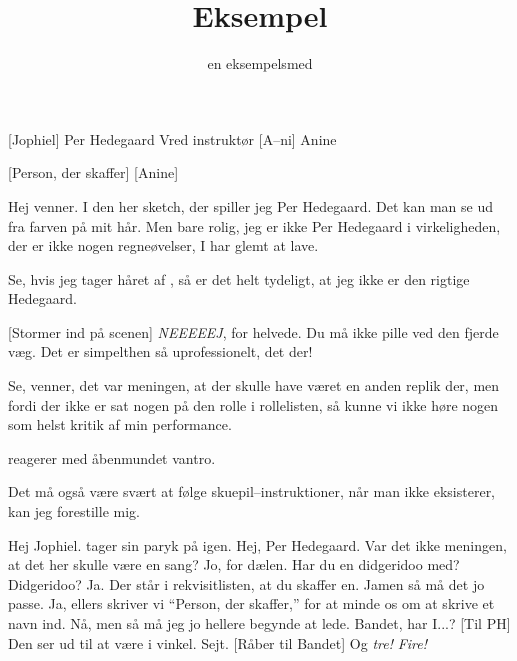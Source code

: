 \documentclass{ucph-revy}
\title{Eksempel}
\author{en eksempelsmed}
\begin{document}
\maketitle

\begin{roles}
  [Jophiel] Per Hedegaard
   Vred instruktør
  [A--ni] Anine
\end{roles}
\begin{props}
  [Person, der skaffer]
  [Anine]
\end{props}

\begin{sketch}
   Hej venner. I den her sketch, der spiller jeg Per
  Hedegaard. Det kan man se ud fra farven på mit hår. Men bare rolig,
  jeg er ikke Per Hedegaard i virkeligheden, der er ikke nogen
  regneøvelser, I har glemt at lave.

  Se, hvis jeg tager håret af , så er det helt
  tydeligt, at jeg ikke er den rigtige Hedegaard.

  [Stormer ind på scenen] \emph{NEEEEEJ}, for helvede. Du må
  ikke pille ved den fjerde væg. Det er simpelthen så uprofessionelt,
  det der!

   Se, venner, det var meningen, at der skulle have været en
  anden replik der, men fordi der ikke er sat nogen på den rolle i
  rollelisten, så kunne vi ikke høre nogen som helst kritik af min
  performance.

   reagerer med åbenmundet vantro.

   Det må også være svært at følge skuepil--instruktioner,
  når man ikke eksisterer, kan jeg forestille mig.

   Hej Jophiel.
   tager sin paryk på igen.
   Hej, Per Hedegaard.
   Var det ikke meningen, at det her skulle være en sang?
   Jo, for dælen. Har du en didgeridoo med?
   Didgeridoo?
   Ja. Der står i rekvisitlisten, at du skaffer en.
   Jamen så må det jo passe.
   Ja, ellers skriver vi "`Person, der skaffer,"' for at
  minde os om at skrive et navn ind.
   Nå, men så må jeg jo hellere begynde at lede.  Bandet, har I...?
  [Til PH] Den ser ud til at være i vinkel.
   Sejt.
  [Råber til Bandet] Og \emph{tre!} \emph{Fire!}
\end{sketch}
\end{document}

